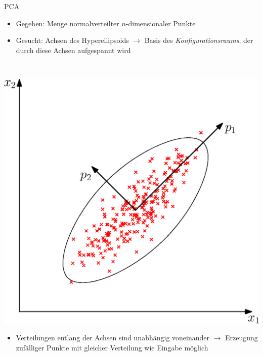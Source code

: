 \documentclass{beamer}
\begin{document}
\begin{frame}{PCA}
 \begin{minipage}{0.6\textwidth}
   \begin{itemize}
    \item Gegeben: Menge normalverteilter $n$-dimensionaler Punkte
    \item Gesucht: Achsen des Hyperellipsoids $\rightarrow$ Basis des \emph{Konfigurationsraums}, der durch diese Achsen aufgespannt wird
  \end{itemize}
 \end{minipage}~
 \begin{minipage}{0.4\textwidth}
  \includegraphics[width=\textwidth]{graphics/pca}
 \end{minipage}
 
 \begin{itemize}
  \item Verteilungen entlang der Achsen sind unabhängig voneinander $\rightarrow$ Erzeugung zufälliger Punkte mit gleicher Verteilung wie Eingabe möglich
 \end{itemize}
\end{frame}
\end{document}
